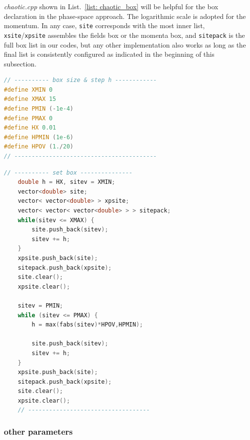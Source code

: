 \documentclass[aps, prd
, preprint
, nofootinbib 
, notitlepage
, superscriptaddress
, longbibliography
]{revtex4-1}
\begin{document}
\textit{chaotic.cpp} shown in List.~\ref{list: chaotic_box} will be helpful for the box declaration in the phase-space approach. The logarithmic scale is adopted for the momentum.
In any case, \texttt{site} corresponds with the most inner list, \texttt{xsite}/\texttt{xpsite} assembles the fields box or the momenta box, and \texttt{sitepack} is the full box list in our codes, but any other implementation also works as long as the final list is consistently configured as indicated in the beginning of this subsection.

\begin{lstlisting}[language = C++, caption={\textit{sample/chaotic.cpp}}, label=list: chaotic_box, firstnumber = 6]
// ---------- box size & step h ------------
#define XMIN 0
#define XMAX 15
#define PMIN (-1e-4)
#define PMAX 0
#define HX 0.01
#define HPMIN (1e-6)
#define HPOV (1./20)
// -----------------------------------------
\end{lstlisting}
\begin{lstlisting}[language = C++, firstnumber = 52]
    // ---------- set box ---------------
    double h = HX, sitev = XMIN;
    vector<double> site;
    vector< vector<double> > xpsite;
    vector< vector< vector<double> > > sitepack;
    while(sitev <= XMAX) {
        site.push_back(sitev);
        sitev += h;
    }
    xpsite.push_back(site);
    sitepack.push_back(xpsite);
    site.clear();
    xpsite.clear();

    sitev = PMIN;
    while (sitev <= PMAX) {
        h = max(fabs(sitev)*HPOV,HPMIN);

        site.push_back(sitev);
        sitev += h;
    }
    xpsite.push_back(site);
    sitepack.push_back(xpsite);
    site.clear();
    xpsite.clear();
    // -----------------------------------
\end{lstlisting}


\subsubsection{other parameters}
\end{document}
